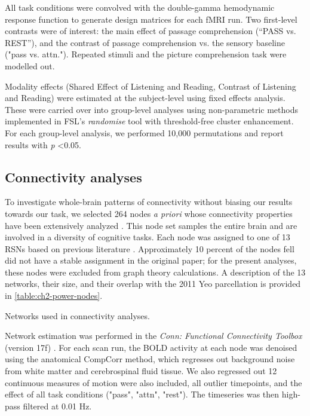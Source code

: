 All task conditions were convolved with the double-gamma hemodynamic response function to generate design matrices for each fMRI run. Two first-level contrasts were of interest: the main effect of passage comprehension (“PASS vs. REST”), and the contrast of passage comprehension vs. the sensory baseline ("pass vs. attn."). Repeated stimuli and the picture comprehension task were modelled out.

Modality effects (Shared Effect of Listening and Reading, Contrast of Listening and Reading) were estimated at the subject-level using fixed effects analysis. These were carried over into group-level analyses using non-parametric methods implemented in FSL’s \textit{randomise} tool with threshold-free cluster enhancement. For each group-level analysis, we performed 10,000 permutations and report results with \textit{p} \textless 0.05. 

\subsection{Connectivity analyses}

To investigate whole-brain patterns of connectivity without biasing our results towards our task, we selected 264 nodes \textit{a priori} whose connectivity properties have been extensively analyzed \citep{Power2011}. This node set samples the entire brain and are involved in a diversity of cognitive tasks. Each node was assigned to one of 13 RSNs based on previous literature \citep{Power2013}. Approximately 10 percent of the nodes fell did not have a stable assignment in the original paper; for the present analyses, these nodes were excluded from graph theory calculations. A description of the 13 networks, their size, and their overlap with the 2011 Yeo parcellation is provided in \ref{table:ch2-power-nodes}. 

\begin{table}
	\scriptsize
	\renewcommand{\tabcolsep}{0.09cm}
	\centering
	
	\caption{Networks used in connectivity analyses.}
	\label{table:ch2-power-nodes}
\end{table}

Network estimation was performed in the \textit{Conn: Functional Connectivity Toolbox} (version 17f) \citep{Nieto-castanon}. For each scan run, the BOLD activity at each node was denoised using the anatomical CompCorr method, which regresses out background noise from white matter and cerebrospinal fluid tissue. We also regressed out 12 continuous measures of motion were also included, all outlier timepoints, and the effect of all task conditions ("pass", "attn", "rest"). The timeseries was then high-pass filtered at 0.01 Hz.

